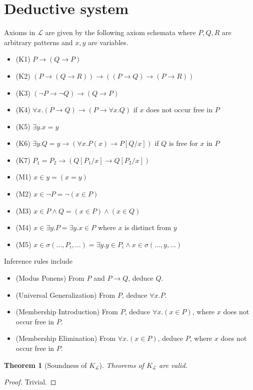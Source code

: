 \documentclass{article}
\theoremstyle{plain}
\newtheorem{thm}{Theorem}
\begin{document}
\section{Deductive system}
Axioms in $\mathcal{L}$ are given by the following axiom schemata where $P, Q, R$ are arbitrary patterns and $x, y$ are variables.
\begin{itemize}
\item (K1) $P \to (Q \to P)$
\item (K2) $(P \to (Q \to R)) \to ((P \to Q) \to (P \to R))$
\item (K3) $(\neg P \to \neg Q) \to (Q \to P)$
\item (K4) $\forall x . (P \to Q) \to (P \to \forall x . Q)$ if $x$ does not occur free in $P$
\item (K5) $\exists y . x = y$
\item (K6) $\exists y . Q = y \to (\forall x . P(x) \to P[Q/x])$ if $Q$ is free for $x$ in $P$
\item (K7) $P_1 = P_2 \to (Q[P_1/x] \to Q[P_2/x])$
\item (M1) $x \in y = (x = y)$
\item (M2) $x \in \neg P = \neg (x \in P)$
\item (M3) $x \in P \wedge Q = (x \in P) \wedge (x \in Q)$
\item (M4) $x \in \exists y . P = \exists y . x \in P$ where $x$ is distinct from $y$
\item (M5) $x \in \sigma(\dots,P_i,\dots) = \exists y . y \in P_i \wedge x \in \sigma(\dots,y,\dots)$
\end{itemize}

Inference rules include
\begin{itemize}
\item (Modus Ponens) From $P$ and $P \to Q$, deduce $Q$.
\item (Universal Generalization) From $P$, deduce $\forall x . P$. 
\item (Membership Introduction) From $P$, deduce $\forall x . (x \in P)$, where $x$ does not occur free in $P$.
\item (Membership Elimination) From $\forall x . (x \in P)$, deduce $P$, where $x$ does not occur free in $P$.
\end{itemize}

\begin{thm}[Soundness of $K_\mathcal{L}$]
Theorems of $K_\mathcal{L}$ are valid.
\end{thm}
\begin{proof}
	Trivial.
\end{proof}
\end{document}
